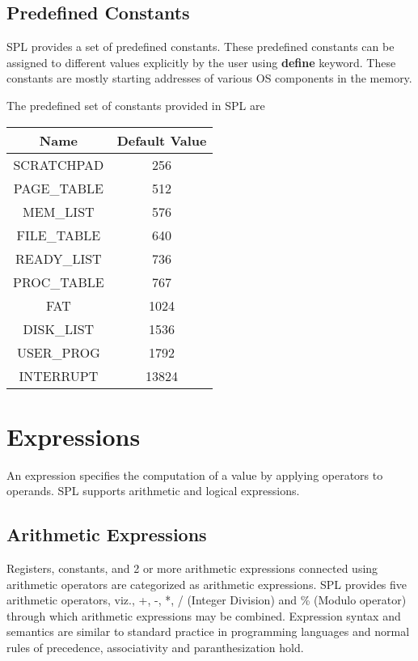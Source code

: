 \documentclass[11pt]{article}
\begin{document}
\subsection{Predefined Constants}
SPL provides a set of predefined constants. These predefined constants can be assigned to different values explicitly by the user using \textbf{define} keyword. These constants are mostly starting addresses of various OS components in the memory.

The predefined set of constants provided in SPL are \\
\begin{center}
\begin{tabular}{| c | c |}
\hline
\textbf{Name} & \textbf{Default Value} \\
\hline
SCRATCHPAD 	& 	256 \\
\hline
PAGE\_TABLE 	& 	512  \\
\hline
MEM\_LIST 	&	576 	\\
\hline
FILE\_TABLE 	& 	640		\\
\hline
READY\_LIST 	& 	736	\\
\hline
PROC\_TABLE 	& 	767 \\
\hline
FAT 		& 	1024    \\
\hline
DISK\_LIST 	& 	1536 	\\
\hline
USER\_PROG 	& 	1792	\\
\hline
INTERRUPT & 	13824	\\
\hline
\end{tabular}
\end{center}


\section{Expressions}
An expression specifies the computation of a value by applying operators to operands. SPL supports arithmetic and logical expressions.

\subsection{Arithmetic Expressions}

Registers, constants, and 2 or more arithmetic expressions connected using arithmetic operators are categorized as arithmetic expressions. SPL provides five arithmetic operators, viz., +, -, *, / (Integer Division) and \% (Modulo operator) through which arithmetic expressions may be combined. Expression syntax and semantics are similar to standard practice in programming languages and normal rules of precedence, associativity and paranthesization hold. 
\end{document}
